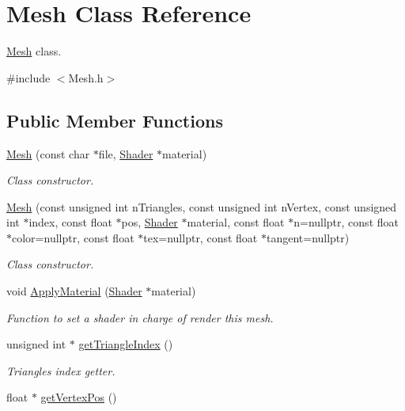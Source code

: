 \hypertarget{class_mesh}{}\section{Mesh Class Reference}
\label{class_mesh}


\hyperlink{class_mesh}{Mesh} class.  




{\ttfamily \#include $<$Mesh.\+h$>$}

\subsection*{Public Member Functions}
\begin{DoxyCompactItemize}
\item 
\hyperlink{class_mesh_a7cb142bf7cd75a954813ccebe1780b77}{Mesh} (const char $\ast$file, \hyperlink{class_shader}{Shader} $\ast$material)
\begin{DoxyCompactList}\small\item\em Class constructor. \end{DoxyCompactList}\item 
\hyperlink{class_mesh_a6b89dd43d75a4c8d5597f88cf7645488}{Mesh} (const unsigned int n\+Triangles, const unsigned int n\+Vertex, const unsigned int $\ast$index, const float $\ast$pos, \hyperlink{class_shader}{Shader} $\ast$material, const float $\ast$n=nullptr, const float $\ast$color=nullptr, const float $\ast$tex=nullptr, const float $\ast$tangent=nullptr)
\begin{DoxyCompactList}\small\item\em Class constructor. \end{DoxyCompactList}\item 
void \hyperlink{class_mesh_a0cf8b6c8062509bd89d8bcc773f45c64}{Apply\+Material} (\hyperlink{class_shader}{Shader} $\ast$material)
\begin{DoxyCompactList}\small\item\em Function to set a shader in charge of render this mesh. \end{DoxyCompactList}\item 
unsigned int $\ast$ \hyperlink{class_mesh_a99962ed2f4a6a0999127f5e4defef6dc}{get\+Triangle\+Index} ()
\begin{DoxyCompactList}\small\item\em Triangles index getter. \end{DoxyCompactList}\item 
float $\ast$ \hyperlink{class_mesh_a2345e6c20aa6a0f05521b8aeb62203f4}{get\+Vertex\+Pos} ()

\end{DoxyCompactItemize}
